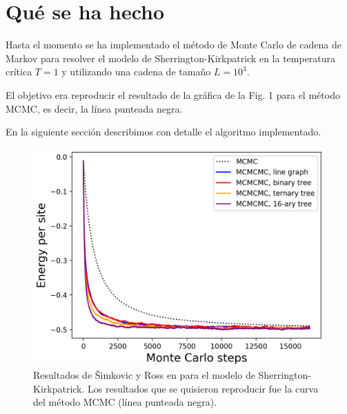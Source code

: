 \documentclass[letterpaper,superscriptaddress,aps,pra,nolongbibliography,twocolumn,showpacs,floatfix,10pt]{revtex4-2} %
\renewcommand{\>}{\rangle}
\newcommand{\<}{\langle}
\newcommand{\shk}{Sherrington-Kirkpatrick}
\newcommand{\syr}{Šimkovic y Ross}
\begin{document}
\section{Qué se ha hecho}
Hasta el momento se ha implementado el método de Monte Carlo 
de cadena de Markov para resolver el modelo de \shk{} 
en la temperatura crítica $T=1$ y utilizando una cadena de tamaño $L=10^3$.

El objetivo era reproducir el resultado de la gráfica de la Fig. 1
para el método MCMC, es decir, la línea punteada negra.

En la siguiente sección describimos con detalle el algoritmo implementado.

\begin{figure}[h]
\includegraphics[width=0.95\columnwidth]{resultados}
\caption{Resultados de \syr{} en \cite{simkovic2021manyconfiguration}
para el modelo de \shk{}. Los resultados que se quisieron reproducir 
fue la curva del método MCMC (línea punteada negra).}
\end{figure}
\end{document}
